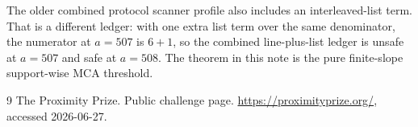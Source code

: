 \documentclass[11pt]{article}
\theoremstyle{remark}
\begin{document}
The older combined protocol scanner profile also includes an interleaved-list
term.  That is a different ledger: with one extra list term over the same
denominator, the numerator at \(a=507\) is \(6+1\), so the combined line-plus-list
ledger is unsafe at \(a=507\) and safe at \(a=508\).  The theorem in this note is
the pure finite-slope support-wise MCA threshold.

\begin{thebibliography}{9}
The Proximity Prize.
\newblock Public challenge page.
\newblock \url{https://proximityprize.org/}, accessed 2026-06-27.
\end{thebibliography}
\end{document}
